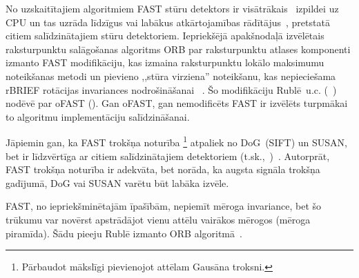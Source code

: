 No uzskaitītajiem algoritmiem FAST stūru detektors ir
visātrākais~\cite{Rosten-tracking}\cite{FAST} izpildei uz CPU un
tas uzrāda līdzīgus vai labākus atkārtojamības rādītājus~\cite{FAST},
pretstatā citiem salīdzinātajiem stūru detektoriem. Iepriekšējā apakšnodaļā
izvēlētais raksturpunktu salāgošanas algoritms ORB par raksturpunktu atlases
komponenti izmanto FAST modifikāciju, kas izmaina raksturpunktu
lokālo maksimumu noteikšanas metodi un pievieno ,,stūra virziena''
noteikšanu, kas nepieciešama rBRIEF rotācijas invariances nodrošināšanai~%
\cite{ORB}. Šo modifikāciju Rublē~u.c.\cite{ORB}
(~) nodēvē par oFAST ().
Gan oFAST, gan nemodificēts FAST ir izvēlēts turpmākai 
to algoritmu implementāciju salīdzināšanai.

Jāpiemin gan, ka FAST trokšņa noturība%
	\footnote{Pārbaudot mākslīgi pievienojot attēlam Gausāna troksni.}
atpaliek no DoG~(SIFT) un SUSAN, bet ir līdzvērtīga ar citiem
salīdzinātajiem detektoriem (t.sk.,~)~\cite{FAST}.
Autorprāt, FAST trokšņa noturība ir adekvāta, bet norāda, ka augsta signāla
trokšņa gadījumā, DoG vai SUSAN varētu būt labāka izvēle.

FAST, no iepriekšminētajām īpašībām, nepiemīt mēroga invariance, bet šo
trūkumu var novērst apstrādājot vienu attēlu vairākos mērogos (mēroga piramīda).
Šādu pieeju Rublē izmanto ORB algoritmā~\cite{ORB}.

